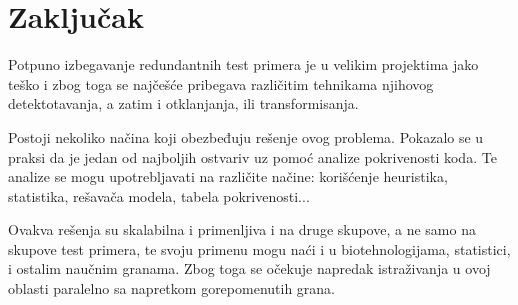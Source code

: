 \documentclass[a4paper]{article}
\begin{document}
\section{Zaključak}
\label{sec:zakljucak}
Potpuno izbegavanje redundantnih test primera je u velikim projektima jako teško i zbog toga se najčešće pribegava različitim tehnikama njihovog detektotavanja, a zatim i otklanjanja, ili transformisanja.

Postoji nekoliko načina koji obezbeđuju rešenje ovog problema. Pokazalo se u praksi da je jedan od najboljih ostvariv uz pomoć analize pokrivenosti koda. Te analize se mogu upotrebljavati na različite načine: korišćenje heuristika, statistika, rešavača modela, tabela pokrivenosti...

Ovakva rešenja su skalabilna i primenljiva i na druge skupove, a ne samo na skupove test primera, te svoju primenu mogu naći i u biotehnologijama, statistici, i ostalim naučnim granama. Zbog toga se očekuje napredak istraživanja u ovoj oblasti paralelno sa napretkom gorepomenutih grana.

\appendix
 

\end{document}
